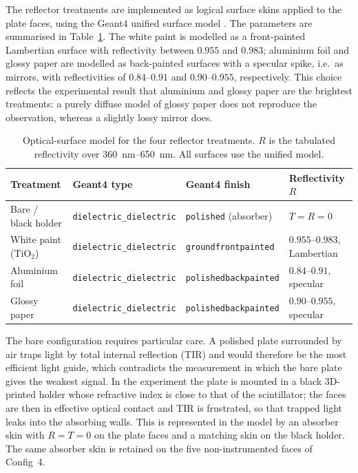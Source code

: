\documentclass[3p]{elsarticle}
\newcommand{\gfour}{Geant4}
\begin{document}
The reflector treatments are implemented as logical surface skins applied to
the plate faces, using the \gfour{} unified surface model
\cite{Levin1996,Nilsson2015}. The parameters are summarised in
Table~\ref{tab:surfaces}. The white paint is modelled as a front-painted
Lambertian surface with reflectivity between $0.955$ and $0.983$; aluminium
foil and glossy paper are modelled as back-painted surfaces with a specular
spike, i.e.\ as mirrors, with reflectivities of $0.84$--$0.91$ and
$0.90$--$0.955$, respectively. This choice reflects the experimental result
that aluminium and glossy paper are the brightest treatments: a purely diffuse
model of glossy paper does not reproduce the observation, whereas a slightly
lossy mirror does.

\begin{table}[t]
\centering
\caption{Optical-surface model for the four reflector treatments. $R$ is the
tabulated reflectivity over \SIrange{360}{650}{\nano\meter}. All surfaces use
the unified model.}
\label{tab:surfaces}
\small
\begin{tabular}{@{}llll@{}}
\toprule
Treatment & \gfour{} type & \gfour{} finish & Reflectivity $R$ \\
\midrule
Bare / black holder & \texttt{dielectric\_dielectric} & \texttt{polished} (absorber) & $T=R=0$ \\
White paint (TiO$_2$)& \texttt{dielectric\_dielectric} & \texttt{groundfrontpainted} & $0.955$--$0.983$, Lambertian \\
Aluminium foil       & \texttt{dielectric\_dielectric} & \texttt{polishedbackpainted} & $0.84$--$0.91$, specular \\
Glossy paper         & \texttt{dielectric\_dielectric} & \texttt{polishedbackpainted} & $0.90$--$0.955$, specular \\
\bottomrule
\end{tabular}
\end{table}

The bare configuration requires particular care. A polished plate surrounded by
air traps light by total internal reflection (TIR) and would therefore be the
most efficient light guide, which contradicts the measurement in which the bare
plate gives the weakest signal. In the experiment the plate is mounted in a
black 3D-printed holder whose refractive index is close to that of the
scintillator; the faces are then in effective optical contact and TIR is
frustrated, so that trapped light leaks into the absorbing walls. This is
represented in the model by an absorber skin with $R=T=0$ on the plate faces
and a matching skin on the black holder. The same absorber skin is retained on
the five non-instrumented faces of Config~4.
\end{document}
